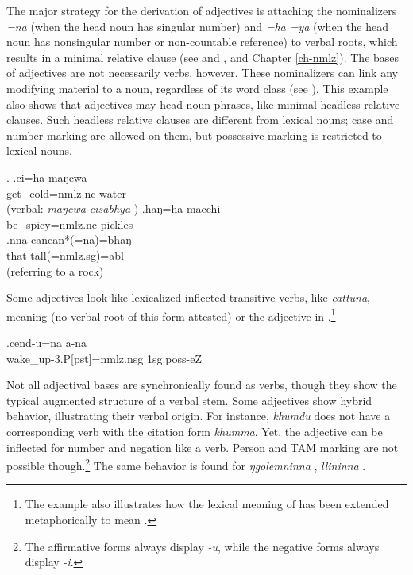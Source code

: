 The major strategy for the derivation of adjectives is attaching the nominalizers \emph{=na} (when the head noun has singular number) and \emph{=ha \ti =ya} (when the head noun has nonsingular number or non-countable reference) to verbal roots, which results in a minimal relative clause (see \Next[a] and \Next[b], and Chapter \ref{ch-nmlz}). The bases of adjectives are not necessarily verbs, however. These nominalizers can link any modifying material to a noun, regardless of its word class (see \Next[c]). This example also shows that adjectives may head noun phrases, like minimal headless relative clauses. Such headless relative clauses are different from lexical nouns; case and number marking are allowed on them, but possessive marking is restricted to lexical nouns. 

\ex. \ag.ci=ha maŋcwa\\
get\_cold{\sc =nmlz.nc} water\\
 (verbal: \emph{maŋcwa cisabhya} )
	\bg.haŋ=ha macchi\\
	be\_spicy{\sc =nmlz.nc} pickles\\
 	\bg.nna cancan*(=na)=bhaŋ\\
		that tall{\sc *(=nmlz.sg)=abl}\\
	  (referring to a rock)
	
Some adjectives look like  lexicalized inflected transitive verbs, like \emph{cattuna}, meaning   (no verbal root of this form attested) or the adjective in \Next.\footnote{The example also illustrates how the lexical meaning of  has been extended metaphorically to mean .} 
	
	\exg.cend-u=na a-na \\
  wake\_up{\sc -3.P[pst]=nmlz.nsg} {\sc 1sg.poss-}eZ\\
   
  

Not all adjectival bases are synchronically found as verbs, though they show the typical augmented structure of a verbal stem. Some adjectives show hybrid behavior, illustrating their verbal origin. For instance, \emph{khumdu}  does not have a corresponding verb with the citation form \emph{khumma}. Yet, the adjective can be inflected for number and negation like a verb. Person and TAM marking are not possible though.\footnote{The affirmative forms always display \emph{-u}, while the negative forms always display \emph{-i}.} The same behavior is found for \emph{ŋgolemninna} ,  \emph{llininna} .

